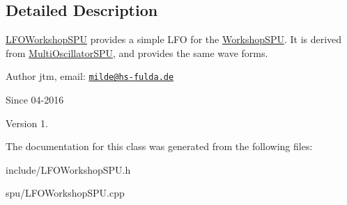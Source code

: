 \subsection{Detailed Description}
\hyperlink{classLFOWorkshopSPU}{L\-F\-O\-Workshop\-S\-P\-U} provides a simple L\-F\-O for the \hyperlink{classWorkshopSPU}{Workshop\-S\-P\-U}. It is derived from \hyperlink{classMultiOscillatorSPU}{Multi\-Oscillator\-S\-P\-U}, and provides the same wave forms.

\begin{DoxyAuthor}{Author}
jtm, email\-:  \href{mailto:milde@hs-fulda.de}{\tt milde@hs-\/fulda.\-de} 
\end{DoxyAuthor}
\begin{DoxySince}{Since}
04-\/2016 
\end{DoxySince}
\begin{DoxyVersion}{Version}
1. 
\end{DoxyVersion}


The documentation for this class was generated from the following files\-:\begin{DoxyCompactItemize}
\item 
include/L\-F\-O\-Workshop\-S\-P\-U.\-h\item 
spu/L\-F\-O\-Workshop\-S\-P\-U.\-cpp\end{DoxyCompactItemize}
